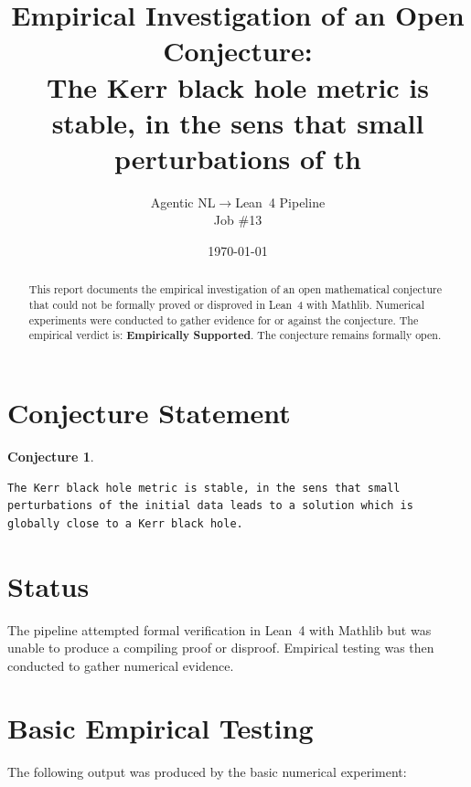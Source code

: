 \documentclass[11pt]{article}
\title{Empirical Investigation of an Open Conjecture:\\
The Kerr black hole metric is stable, in the sens that small perturbations of th}
\author{Agentic NL$\to$Lean~4 Pipeline \\ \small Job \#13}
\date{\today}
\newtheorem{conjecture}{Conjecture}
\begin{document}
\maketitle

\begin{abstract}
This report documents the empirical investigation of an open mathematical conjecture
that could not be formally proved or disproved in Lean~4 with Mathlib.
Numerical experiments were conducted to gather evidence for or against the conjecture.
The empirical verdict is: \textbf{\textcolor{green!70!black}{Empirically Supported}}.
The conjecture remains formally open.
\end{abstract}

\section{Conjecture Statement}

\begin{conjecture}
\begin{lstlisting}
The Kerr black hole metric is stable, in the sens that small perturbations of the initial data leads to a solution which is globally close to a Kerr black hole.
\end{lstlisting}
\end{conjecture}

\section{Status}

\begin{center}
\end{center}

The pipeline attempted formal verification in Lean~4 with Mathlib but was unable to
produce a compiling proof or disproof. Empirical testing was then conducted to gather
numerical evidence.

\section{Basic Empirical Testing}

The following output was produced by the basic numerical experiment:
\end{document}
